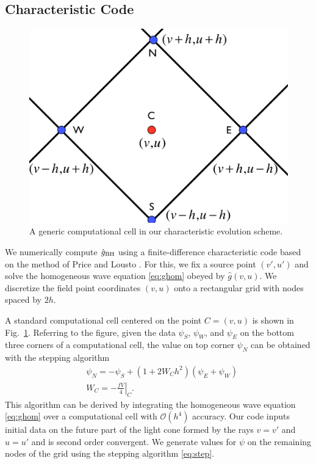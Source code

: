 \begin{refsection}
\subsection{Characteristic Code}
\label{sec:charcode}
\begin{figure}[t]
\includegraphics[width = 1 \columnwidth]{chapter_echo/etc/ComputationalCell}
\caption{
A generic computational cell in our characteristic evolution scheme.
}
\label{fig:ComCell}
\end{figure}

We numerically compute $\hat g_{\rm BH}$ using  a finite-difference characteristic code based on the method of Price and Lousto \cite{Lousto:1997wf}. 
For this, we fix a source point $(v',u')$ and solve the homogeneous wave equation \eqref{eq:ghom} obeyed by $\hat g(v,u)$. 
We discretize the field point coordinates $(v,u)$  onto a rectangular grid with nodes spaced by $2h$. 

A standard computational cell centered on the point $C=(v,u)$ is shown in Fig.~\ref{fig:ComCell}.
Referring to the figure, given the data $\psi_S$, $\psi_W$, and $\psi_E$ on the bottom three corners of a computational cell, the value on top corner $\psi_N$ can be obtained with the stepping algorithm
\begin{align}
\label{eq:step}
&\psi_N=-\psi_S+(1+2W_Ch^2)(\psi_E+\psi_W) \\
&W_C=\left .-\frac{fV}{4}\right |_{C}. 
\end{align}
This algorithm can be derived by integrating the homogeneous wave equation \eqref{eq:ghom} over a computational cell with $\mathcal{O}(h^4)$ accuracy.
Our code inputs initial data on the future part of the light cone formed by the rays $v=v'$ and $u=u'$ and 
is second order convergent. 
We generate values for $\psi$ on the remaining nodes of the grid using the stepping algorithm \eqref{eq:step}.


\end{refsection}
